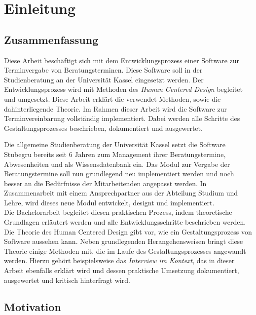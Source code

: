 \chapter{Einleitung}
\label{chapter:introduction}

\section{Zusammenfassung}

Diese Arbeit beschäftigt sich mit dem Entwicklungsprozess einer Software zur
Terminvergabe von Beratungsterminen. Diese Software soll in der Studienberatung
an der Universität Kassel eingesetzt werden. Der Entwicklungsprozess wird mit
Methoden des \textit{Human Centered Design} begleitet und umgesetzt. Diese
Arbeit erklärt die verwendet Methoden, sowie die dahinterliegende Theorie. Im
Rahmen dieser Arbeit wird die Software zur Terminvereinbarung vollständig
implementiert. Dabei werden alle Schritte des Gestaltungsprozesses beschrieben,
dokumentiert und ausgewertet.

Die allgemeine Studienberatung der Universität Kassel setzt die Software
Stubegru bereits seit 6 Jahren zum Management ihrer Beratungstermine,
Abwesenheiten und als Wissensdatenbank ein. Das Modul zur Vergabe der
Beratungstermine soll nun grundlegend neu implementiert werden und noch besser
an die Bedürfnisse der Mitarbeitenden angepasst werden. In Zusammenarbeit mit
einem Ansprechpartner aus der Abteilung Studium und Lehre, wird dieses neue
Modul entwickelt, designt und implementiert.\\ Die Bachelorarbeit begleitet
diesen praktischen Prozess, indem theoretische Grundlagen erläutert werden und
alle Entwicklungsschritte beschrieben werden. Die Theorie des Human Centered
Design gibt vor, wie ein Gestaltungsprozess von Software aussehen kann. Neben
grundlegenden Herangehensweisen bringt diese Theorie einige Methoden mit, die
im Laufe des Gestaltungsprozesses angewandt werden. Hierzu gehört
beispielsweise das \textit{Interview im Kontext}, das in dieser Arbeit
ebenfalls erklärt wird und dessen praktische Umsetzung dokumentiert,
ausgewertet und kritisch hinterfragt wird.

\section{Motivation}

